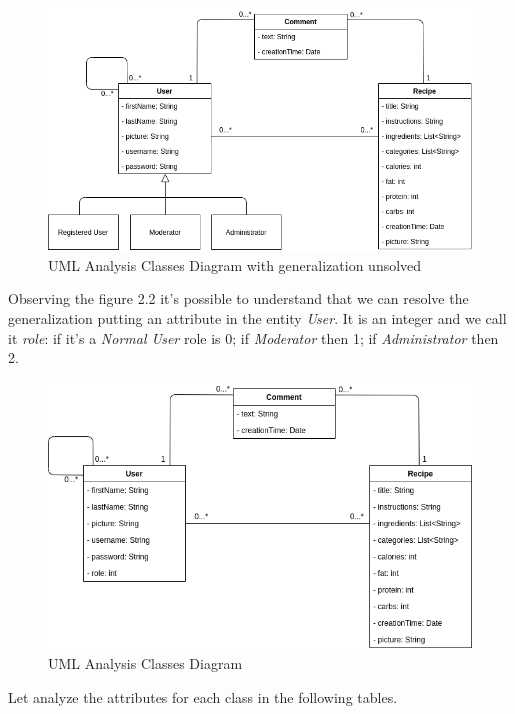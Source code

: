 \documentclass[a4paper]{report}
\begin{document}
\begin{figure}[htpb]
	\centering
	\includegraphics[scale=0.5]{img/ClassDiagram_generaliz.png}
	\caption{UML Analysis Classes Diagram with generalization unsolved}
\end{figure}

\noindent Observing the figure 2.2 it's possible to understand that we can resolve the generalization putting an attribute in the entity \emph{User}. It is an integer and we call it \emph{role}: if it's a \emph{Normal User} role is 0; if \emph{Moderator} then 1; if \emph{Administrator} then 2.

\begin{figure}[htpb]
	\centering
	\includegraphics[scale=0.5]{img/ClassDiagram.png}
	\caption{UML Analysis Classes Diagram}
\end{figure}

Let analyze the attributes for each class in the following tables.
\end{document}
